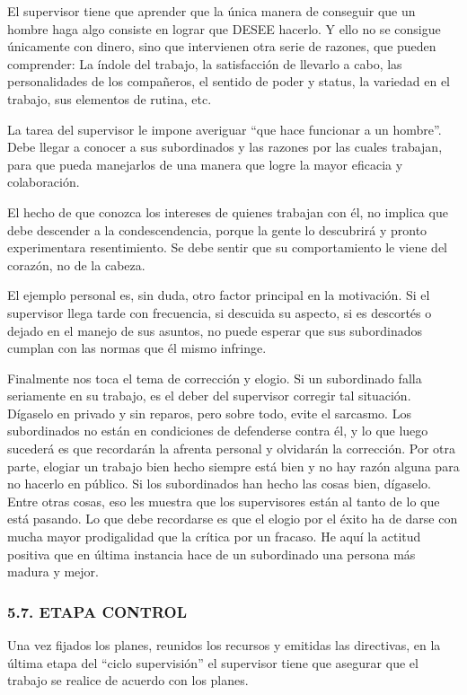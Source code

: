 El supervisor tiene que aprender que la única manera de conseguir que un hombre haga algo consiste en lograr que DESEE hacerlo. Y ello no se consigue únicamente con dinero, sino que intervienen otra serie de razones, que pueden comprender: La índole del trabajo, la satisfacción de llevarlo a cabo, las personalidades de los compañeros, el sentido de poder y status, la variedad en el trabajo, sus elementos de rutina, etc.

La tarea del supervisor le impone averiguar “que hace funcionar a un hombre”. Debe llegar a conocer a sus subordinados y las razones por las cuales trabajan, para que pueda manejarlos de una manera que logre la mayor eficacia y colaboración.

El hecho de que conozca los intereses de quienes trabajan con él, no implica que debe descender a la condescendencia, porque la gente lo descubrirá y pronto experimentara resentimiento. Se debe sentir que su comportamiento le viene del corazón, no de la cabeza.



El ejemplo personal es, sin duda, otro factor principal en la motivación. Si el supervisor llega tarde con frecuencia, si descuida su aspecto, si es descortés o dejado en el manejo de sus asuntos, no puede esperar que sus subordinados cumplan con las normas que él mismo infringe.

Finalmente nos toca el tema de corrección y elogio. Si un subordinado falla seriamente en su trabajo, es el deber del supervisor corregir tal situación. Dígaselo en privado y sin reparos, pero sobre todo, evite el sarcasmo. Los subordinados no están en condiciones de defenderse contra él, y lo que luego sucederá es que recordarán la afrenta personal y olvidarán la corrección. Por otra parte, elogiar un trabajo bien hecho siempre está bien y no hay razón alguna para no hacerlo en público. Si los subordinados han hecho las cosas bien, dígaselo. Entre otras cosas, eso les muestra que los supervisores están al tanto de lo que está pasando. Lo que debe recordarse es que el elogio por el éxito ha de darse con mucha mayor prodigalidad que la crítica por un fracaso. He aquí la actitud positiva que en última instancia hace de un subordinado una persona más madura y mejor.

\subsubsection*{5.7. ETAPA CONTROL}
Una vez fijados los planes, reunidos los recursos y emitidas las directivas, en la última etapa del “ciclo supervisión” el supervisor tiene que asegurar que el trabajo se realice de acuerdo con los planes.

